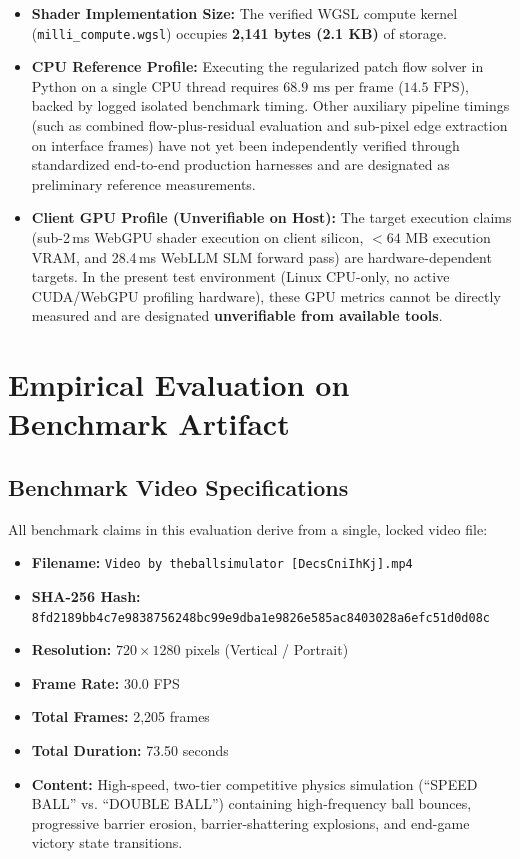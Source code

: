 \documentclass[11pt]{article}
\begin{document}
\begin{itemize}
    \item \textbf{Shader Implementation Size:} The verified WGSL compute kernel (\texttt{milli\_compute.wgsl}) occupies \textbf{2,141 bytes (2.1 KB)} of storage.
    \item \textbf{CPU Reference Profile:} Executing the regularized patch flow solver in Python on a single CPU thread requires \textbf{$68.9\text{ ms per frame}$} ($14.5\text{ FPS}$), backed by logged isolated benchmark timing. Other auxiliary pipeline timings (such as combined flow-plus-residual evaluation and sub-pixel edge extraction on interface frames) have not yet been independently verified through standardized end-to-end production harnesses and are designated as preliminary reference measurements.
    \item \textbf{Client GPU Profile (Unverifiable on Host):} The target execution claims (sub-2\,ms WebGPU shader execution on client silicon, $<64\text{ MB}$ execution VRAM, and 28.4\,ms WebLLM SLM forward pass) are hardware-dependent targets. In the present test environment (Linux CPU-only, no active CUDA/WebGPU profiling hardware), these GPU metrics cannot be directly measured and are designated \textbf{unverifiable from available tools}.
\end{itemize}

\section{Empirical Evaluation on Benchmark Artifact}

\subsection{Benchmark Video Specifications}

All benchmark claims in this evaluation derive from a single, locked video file:
\begin{itemize}
    \item \textbf{Filename:} \nolinkurl{Video by theballsimulator [DecsCniIhKj].mp4}
    \item \textbf{SHA-256 Hash:} \nolinkurl{8fd2189bb4c7e9838756248bc99e9dba1e9826e585ac8403028a6efc51d0d08c}
    \item \textbf{Resolution:} $720 \times 1280$ pixels (Vertical / Portrait)
    \item \textbf{Frame Rate:} 30.0 FPS
    \item \textbf{Total Frames:} 2,205 frames
    \item \textbf{Total Duration:} 73.50 seconds
    \item \textbf{Content:} High-speed, two-tier competitive physics simulation (``SPEED BALL'' vs. ``DOUBLE BALL'') containing high-frequency ball bounces, progressive barrier erosion, barrier-shattering explosions, and end-game victory state transitions.
\end{itemize}
\end{document}
